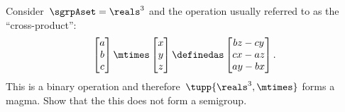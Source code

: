\begin{exercise}
    \label{ex:cross_prod}
    Consider~$\sgrpAset=\reals^3$ and the operation usually referred to as the ``cross-product'':
    \begin{equation*}
        \begin{bmatrix}
            a \\ b\\ c
        \end{bmatrix}
        \mtimes
        \begin{bmatrix}
            x \\ y \\ z
        \end{bmatrix}
        \definedas
        \begin{bmatrix}
            bz-cy \\
            cx-az \\
            ay-bx
        \end{bmatrix}.
    \end{equation*}
    This is a binary operation and therefore~$\tupp{\reals^3,\mtimes}$ forms a magma.
    Show that the this does not form a semigroup.
\end{exercise}
%
